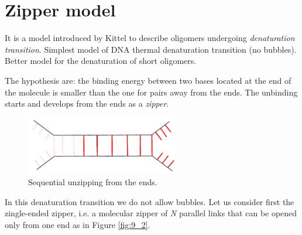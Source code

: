 \documentclass[../main/main.tex]{subfiles}
\begin{document}
\section{Zipper model}

It is a model introduced by Kittel to describe oligomers undergoing \emph{denaturation transition}.
Simplest model of DNA thermal denaturation transition (no bubbles). Better model for the denaturation of short oligomers.

The hypothesis are: the binding energy between two bases located at the end of the molecule is smaller than the one for pairs away from the ends. The unbinding starts and develops from the ends as a \emph{zipper}.
\begin{figure}[h!]
\centering
\includegraphics[width=0.6\textwidth]{../lessons/9_image/1.pdf}
\caption{\label{fig:9_1} Sequential unzipping from the ends.}
\end{figure}

In this denaturation transition we do not allow bubbles.
Let us consider first the zingle-ended zipper, i.e. a molecular zipper of \emph{N} parallel links that can be opened only from one end as in Figure \ref{fig:9_2}.
\end{document}
